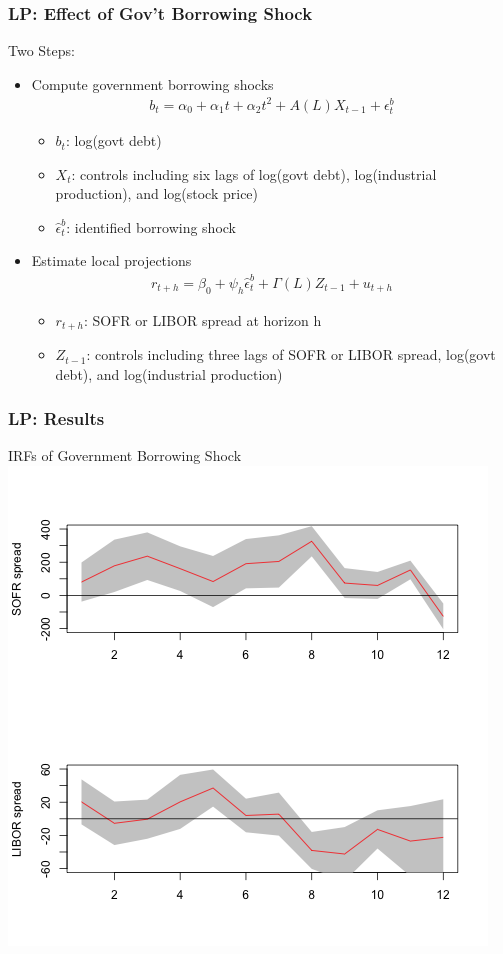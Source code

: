 \documentclass[10pt]{beamer}
\begin{document}
\begin{frame}
  \frametitle{LP: Effect of Gov't Borrowing Shock}
Two Steps:
\begin{itemize}
  \item Compute government borrowing shocks
  \begin{align*}
    b_t=\alpha_0+\alpha_1t+\alpha_2t^2+A(L)X_{t-1}+\epsilon_t^b
  \end{align*}
  \begin{itemize}
    \item $b_t$: log(govt debt)
    \item $X_t$: controls including six lags of log(govt debt), log(industrial production), and log(stock price)
    \item $\hat{\epsilon}_t^b$: identified borrowing shock
  \end{itemize}
  \item Estimate local projections
  \begin{align*}
    r_{t+h}=\beta_0+\psi_h \hat{\epsilon}_t^b +\Gamma(L)Z_{t-1}+u_{t+h}
  \end{align*}
    \begin{itemize}
      \item $r_{t+h}$: SOFR or LIBOR spread at horizon h
      \item $Z_{t-1}$: controls including three lags of SOFR or LIBOR spread, log(govt debt), and log(industrial production)
    \end{itemize}
\end{itemize}
\end{frame}


\begin{frame}
  \frametitle{LP: Results}
  \begin{center}
    IRFs of Government Borrowing Shock
    \includegraphics[scale=0.5]{irfs.png}
  \end{center}
\end{frame}
\end{document}
